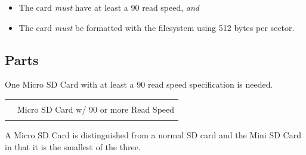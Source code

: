 \begin{itemize}
  \item The card \textit{must} have at least a \num{90}  read
    speed, \textit{and}
  \item The card \textit{must} be formatted with the  filesystem
    using \num{512} bytes per sector.
\end{itemize}



\subsection{Parts}

One Micro SD Card with at least a \num{90}  read speed specification
is needed.

\begin{table}[H]
\centering
\begin{tabu} { X[1,r,m] | X[6,l,m] }
  \thrule
   &  \\  & Micro SD Card w/ \num{90}  or more Read Speed \\
  \bhrule
\end{tabu}
\end{table}

A Micro SD Card is distinguished from a normal SD card and the Mini SD Card in
that it is the smallest of the three.

